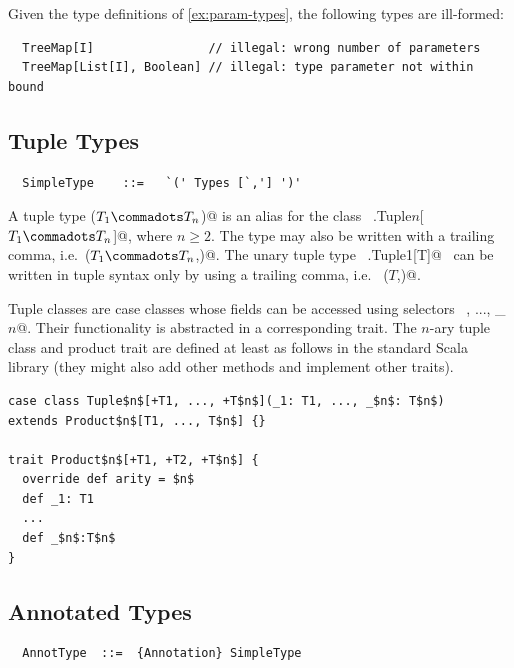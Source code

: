 \example Given the type definitions of \ref{ex:param-types},
the following types are ill-formed:

\begin{lstlisting}
  TreeMap[I]                // illegal: wrong number of parameters
  TreeMap[List[I], Boolean] // illegal: type parameter not within bound
\end{lstlisting}


\subsection{Tuple Types}\label{sec:tuple-types}

\syntax\begin{lstlisting}
  SimpleType    ::=   `(' Types [`,'] ')'
\end{lstlisting}

A tuple type \lstinline@($T_1 \commadots T_n$)@ is an alias for the
class ~\lstinline@scala.Tuple$n$[$T_1 \commadots T_n$]@, where $n \geq
2$.  The type may also be written with a trailing comma, i.e.\
\lstinline@($T_1 \commadots T_n$,)@.  The unary tuple type
~\lstinline@scala.Tuple1[T]@~ can be written in tuple syntax only by
using a trailing comma, i.e. ~\lstinline@($T$,)@. 

Tuple classes are case classes whose fields can be accessed using
selectors ~\code{_1}, ..., \lstinline@_$n$@. Their functionality is
abstracted in a corresponding \code{Product} trait. The $n$-ary tuple
class and product trait are defined at least as follows in the
standard Scala library (they might also add other methods and
implement other traits).

\begin{lstlisting}
case class Tuple$n$[+T1, ..., +T$n$](_1: T1, ..., _$n$: T$n$) 
extends Product$n$[T1, ..., T$n$] {}

trait Product$n$[+T1, +T2, +T$n$] {
  override def arity = $n$
  def _1: T1
  ...
  def _$n$:T$n$
}
\end{lstlisting}

\subsection{Annotated Types}

\syntax\begin{lstlisting}
  AnnotType  ::=  {Annotation} SimpleType
\end{lstlisting}

